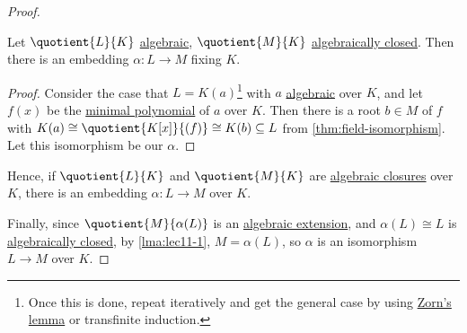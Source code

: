 \begin{proof}
	\begin{lemma}
		Let \(\quotient{L}{K} \) \hyperref[def:algebraic-extension]{algebraic}, \(\quotient{M}{K} \) \hyperref[def:algebraically-closed]{algebraically closed}. Then there is an embedding \(\alpha \colon L \to M\) fixing \(K\).
	\end{lemma}
	\begin{proof}
		Consider the case that \(L = K(a)\)\footnote{Once this is done, repeat iteratively and get the general case by using \hyperref[thm:Zorn]{Zorn's lemma} or transfinite induction.} with \(a\) \hyperref[def:algebraic]{algebraic} over \(K\), and let \(f(x)\) be the \hyperref[def:minimal-polynomial]{minimal polynomial} of \(a\) over \(K\). Then there is a root \(b\in M\) of \(f\) with \(K(a) \cong \quotient{K[x]}{(f)} \cong K(b) \subseteq L\) from \autoref{thm:field-isomorphism}. Let this isomorphism be our \(\alpha \).
	\end{proof}
	Hence, if \(\quotient{L}{K} \) and \(\quotient{M}{K} \) are \hyperref[def:algebraic-closure]{algebraic closures} over \(K\), there is an embedding \(\alpha \colon L \to M\) over \(K\).

	Finally, since \(\quotient{M}{\alpha (L)} \) is an \hyperref[def:algebraic-extension]{algebraic extension}, and \(\alpha (L) \cong L\) is \hyperref[def:algebraically-closed]{algebraically closed}, by \autoref{lma:lec11-1}, \(M = \alpha (L)\), so \(\alpha \) is an isomorphism \(L \to M\) over \(K\).
\end{proof}